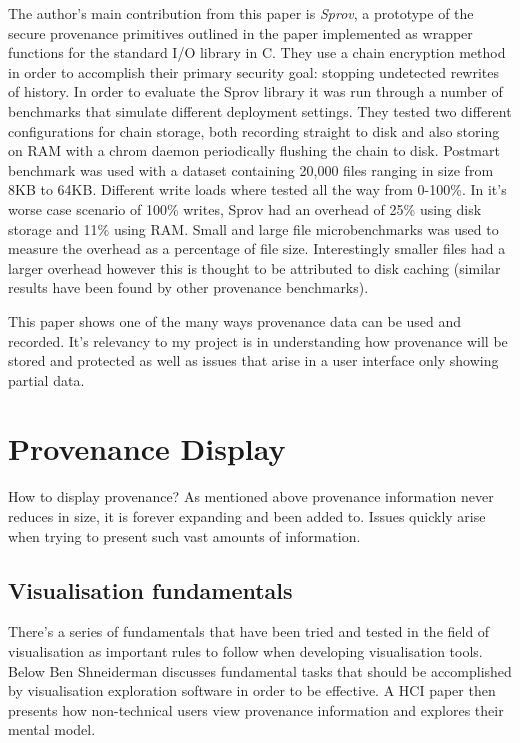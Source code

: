 The author's main contribution from this paper is \textit{Sprov}, a prototype of the secure provenance primitives outlined in the paper implemented as wrapper functions for the standard I/O library in C. They use a chain encryption method in order to accomplish their primary security goal: stopping undetected rewrites of history. In order to evaluate the Sprov library it was run through a number of benchmarks that simulate different deployment settings. They tested two different configurations for chain storage, both recording straight to disk and also storing on RAM with a chrom daemon periodically flushing the chain to disk. Postmart benchmark was used with a dataset containing 20,000 files ranging in size from 8KB to 64KB. Different write loads where tested all the way from 0-100\%. In it's worse case scenario of 100\% writes, Sprov had an overhead of 25\% using disk storage and 11\% using RAM. Small and large file microbenchmarks was used to measure the overhead as a percentage of file size. Interestingly smaller files had a larger overhead however this is thought to be attributed to disk caching (similar results have been found by other provenance benchmarks).

This paper shows one of the many ways provenance data can be used and recorded. It's relevancy to my project is in understanding how provenance will be stored and protected as well as issues that arise in a user interface only showing partial data.

\section{Provenance Display}
\label{sec:provenance_display}

How to display provenance? As mentioned above provenance information never reduces in size, it is forever expanding and been added to. Issues quickly arise when trying to present such vast amounts of information. 

\subsection{Visualisation fundamentals}
\label{sub:visualisation_fundamentals}

There's a series of fundamentals that have been tried and tested in the field of visualisation as important rules to follow when developing visualisation tools. Below Ben Shneiderman discusses fundamental tasks that should be accomplished by visualisation exploration software in order to be effective. A HCI paper then presents how non-technical users view provenance information and explores their mental model.

